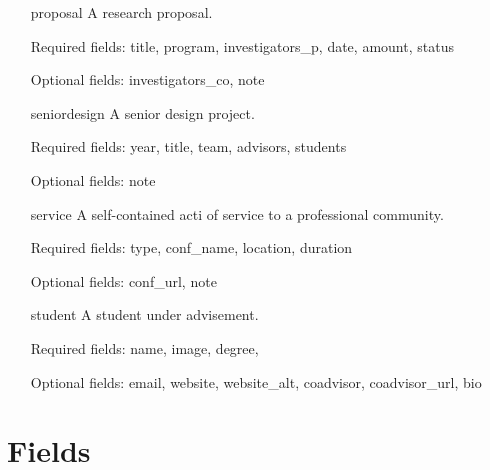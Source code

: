 \documentclass[11pt,letterpaper]{article}
\newcommand{\entry}[1]{\textsf{#1}}
\newcommand{\field}[1]{\textsf{#1}}
\begin{document}
\begin{itemize}
  \item[\entry{proposal}] A research proposal.
    
    Required fields:
    \field{title},
    \field{program},
    \field{investigators\_p},
    \field{date},
    \field{amount},
    \field{status}

    Optional fields:
    \field{investigators\_co},
    \field{note}

  \item[\entry{seniordesign}] A senior design project.
    
    Required fields:
    \field{year},
    \field{title},
    \field{team},
    \field{advisors},
    \field{students}

    Optional fields:
    \field{note}

  \item[\entry{service}] A self-contained acti of service to a professional community.

    Required fields:
    \field{type},
    \field{conf\_name},
    \field{location},
    \field{duration}

    Optional fields:
    \field{conf\_url},
    \field{note}

  \item[\entry{student}] A student under advisement.
 
    Required fields:
    \field{name},
    \field{image},
    \field{degree},

    Optional fields:
    \field{email},
    \field{website},
    \field{website\_alt},
    \field{coadvisor},
    \field{coadvisor\_url},
    \field{bio}
\end{itemize}


\section{Fields}\label{sec:fields}
\end{document}

